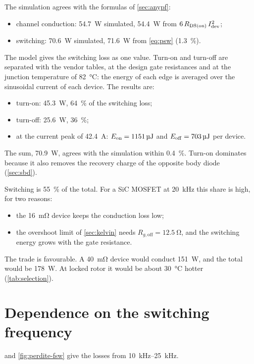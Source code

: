 The simulation agrees with the formulas of \cref{sec:anypf}:
\begin{itemize}
  \item channel conduction: \SI{54.7}{\watt} simulated, \SI{54.4}{\watt}
        from $6\,R_{\mathrm{DS(on)}}\,I_\mathrm{dev}^2$;
  \item switching: \SI{70.6}{\watt} simulated, \SI{71.6}{\watt} from
        \cref{eq:psw} (\SI{1.3}{\percent}).
\end{itemize}

The model gives the switching loss as one value. Turn-on and turn-off are
separated with the vendor tables, at the design gate resistances and at the
junction temperature of \SI{82}{\celsius}: the energy of each edge is averaged
over the sinusoidal current of each device. The results are:
\begin{itemize}
  \item turn-on: \SI{45.3}{\watt}, \SI{64}{\percent} of the switching loss;
  \item turn-off: \SI{25.6}{\watt}, \SI{36}{\percent};
  \item at the current peak of \SI{42.4}{\ampere}: $\Eon = \SI{1151}{\micro\joule}$
        and $\Eoff = \SI{703}{\micro\joule}$ per device.
\end{itemize}
The sum, \SI{70.9}{\watt}, agrees with the simulation within
\SI{0.4}{\percent}. Turn-on dominates because it also removes the recovery
charge of the opposite body diode (\cref{sec:sbd}).

Switching is \SI{55}{\percent} of the total. For a SiC MOSFET at
\SI{20}{\kilo\hertz} this share is high, for two reasons:
\begin{itemize}
  \item the \SI{16}{\milli\ohm} device keeps the conduction loss low;
  \item the overshoot limit of \cref{sec:kelvin} needs
        $R_{g,\mathrm{off}} = \SI{12.5}{\ohm}$, and the switching energy grows
        with the gate resistance.
\end{itemize}
The trade is favourable. A \SI{40}{\milli\ohm} device would conduct
\SI{151}{\watt}, and the total would be \SI{178}{\watt}. At locked rotor it
would be about \SI{30}{\celsius} hotter (\cref{tab:selection}).

\section{Dependence on the switching frequency}

 and \cref{fig:perdite-fsw} give the losses from
\SIrange{10}{25}{\kilo\hertz}.

